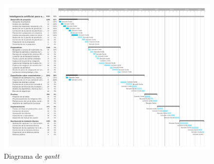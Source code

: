 \documentclass[11pt]{charter}
\begin{document}
\begin{figure}[htbpt]
\centering 
\includegraphics[angle=270,width=1\textwidth]{./Figuras/Gantt5.pdf} %
\caption{Diagrama de \textit{gantt }}
\label{fig:gantt}
\end{figure}






\end{document}
